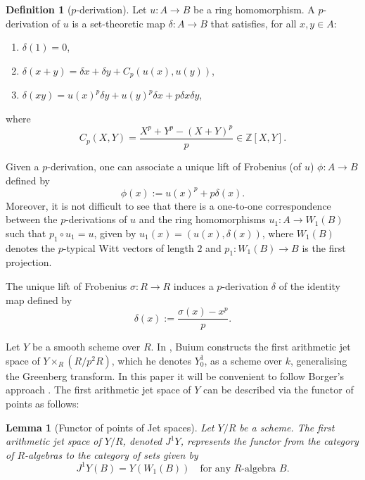 \documentclass[11pt]{amsart}
\theoremstyle{plain}
\newtheorem{lemma}{Lemma}
\theoremstyle{definition}
\newtheorem{definition}{Definition}
\begin{document}
\begin{definition}[$p$-derivation] 
Let $u: A\rightarrow B$ be a ring homomorphism. A $p$-derivation of $u$ is a set-theoretic map $\delta:A \rightarrow B$ that satisfies, for all $x,y \in A$:
\begin{enumerate}
    \item[\rm (i)] $\delta (1) = 0$,
    \item[\rm (ii)] $\delta (x+y) = \delta x + \delta y + C_p(u(x),u(y))$,
    \item[\rm (iii)] $\delta(xy) = u(x)^p \delta y + u(y)^p \delta x + p \delta x \delta y$,
\end{enumerate}
where
$$C_p(X,Y) =  \frac{X^p+Y^p -(X+Y)^p}{p}\in\mathbb{Z}[X,Y].$$ 
\end{definition}

Given a $p$-derivation, one can associate a unique lift of Frobenius (of $u$) $\phi: A\rightarrow B$ defined by 
$$\phi(x):=u(x)^{p}+p\delta(x).$$
Moreover, it is not difficult to see that there is a one-to-one correspondence between the $p$-derivations of $u$ and the ring homomorphisms $u_1:A\rightarrow W_{1}(B)$ such that $p_{1} \circ u_1=u$, given by $u_{1}(x)=(u(x),\delta(x))$, where $W_{1}(B)$ denotes the $p$-typical Witt vectors of length $2$ and $p_1: W_1(B)\rightarrow B$ is the first projection.

\medskip

The unique lift of Frobenius $\sigma :R\rightarrow R$ induces a $p$-derivation $\delta$ of the identity map defined by 
$$\delta(x):=\frac{\sigma(x)-x^p}{p}.$$


Let $Y$ be a smooth scheme over $R$. In \cite{buium:96}, Buium constructs the first arithmetic jet space of $Y\times  _R (R/p^2 R)$, which he denotes $Y^1 _0$, as a scheme over $k$, generalising the Greenberg transform. In this paper it will be convenient to follow Borger's approach \cite{bor1} \cite{bor2}. The first arithmetic jet space of $Y$ can be described via the functor of points as follows:

\begin{lemma}[Functor of points of Jet spaces] 
Let $Y/R$ be a scheme. The first arithmetic jet space of $Y/R$, denoted $J^1 Y$, represents the functor from the category of $R$-algebras to the category of sets given by 
$$J^1 Y (B)=Y(W_1(B)) \quad \text{for any } R\text{-algebra } B.$$
\end{lemma}
\end{document}
